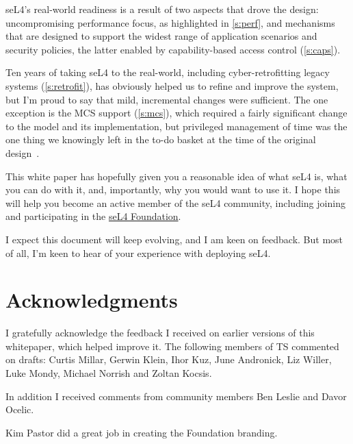 \documentclass[english,a4paper,12pt]{report}
\newcommand{\Acks}{\section*{Acknowledgments}}
\newcommand{\Acks}{\chapter*{Acknowledgments}}
\begin{document}
  seL4's real-world readiness is a result of two aspects that drove
  the design: uncompromising performance focus, as highlighted in
  \autoref{s:perf}, and mechanisms that are designed to support the
  widest range of application scenarios and security policies, the
  latter enabled by capability-based access control
  (\autoref{s:caps}).

  Ten years of taking seL4 to the real-world, including
  cyber-retrofitting legacy systems (\autoref{s:retrofit}), has obviously
  helped us to refine and improve the system, but I'm proud to say that
  mild, incremental changes were sufficient. The one exception is the
  MCS support (\autoref{s:mcs}), which required a fairly significant change
  to the model and its implementation, but privileged management of
  time was the one thing we knowingly left in the to-do basket at
  the time of the original design~\citep{Heiser_Elphinstone_16}.

  This white paper has hopefully given you a reasonable idea of what
  seL4 is, what you can do with it, and, importantly, why you would
  want to use it. I hope this will help you become an active member of
  the seL4 community, including joining and participating in the
  \href{https://sel4.systems/Foundation}{seL4 Foundation}.

  I expect this document will keep evolving, and I am keen on
  feedback. But most of all, I'm keen to hear of your experience with
  deploying seL4.


  \Acks

  I gratefully acknowledge the feedback I received on earlier versions
  of this whitepaper, which helped improve it. The following members of TS commented on drafts:
  Curtis Millar,
  Gerwin Klein,
  Ihor Kuz,
  June Andronick,
  Liz Willer,
  Luke Mondy,
  Michael Norrish and
  Zoltan Kocsis.

  In addition I received comments from community members
  Ben Leslie and
  Davor Ocelic.

  Kim Pastor did a great job in creating the Foundation branding.
  \cleardoublepage
  \sloppy
  
  
\end{document}
